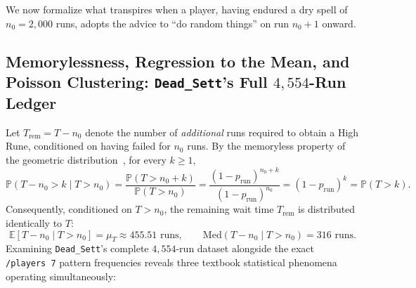 \documentclass[11pt,reqno]{amsart}
\theoremstyle{definition}
\begin{document}
We now formalize what transpires when a player, having endured a dry spell of $n_0 = 2{,}000$ runs, adopts the advice to ``do random things'' on run $n_0 + 1$ onward.

\subsection{Memorylessness, Regression to the Mean, and Poisson Clustering: \texttt{Dead\_Sett}'s Full $4{,}554$-Run Ledger}
\label{subsec:deadsett}

Let $T_{\text{rem}} = T - n_0$ denote the number of \emph{additional} runs required to obtain a High Rune, conditioned on having failed for $n_0$ runs. By the memoryless property of the geometric distribution~\cite{feller1968}, for every $k \ge 1$,
\begin{equation}
    \mathbb{P}(T - n_0 > k \mid T > n_0) = \frac{\mathbb{P}(T > n_0 + k)}{\mathbb{P}(T > n_0)} = \frac{(1 - p_{\text{run}})^{n_0 + k}}{(1 - p_{\text{run}})^{n_0}} = (1 - p_{\text{run}})^k = \mathbb{P}(T > k).
\end{equation}
Consequently, conditioned on $T > n_0$, the remaining wait time $T_{\text{rem}}$ is distributed identically to $T$:
\begin{equation}
    \mathbb{E}[T - n_0 \mid T > n_0] = \mu_T \approx 455.51\text{ runs}, \qquad \text{Med}(T - n_0 \mid T > n_0) = 316\text{ runs}.
\end{equation}
Examining \texttt{Dead\_Sett}'s complete $4{,}554$-run dataset alongside the exact \texttt{/players~7} pattern frequencies reveals three textbook statistical phenomena operating simultaneously:
\end{document}
